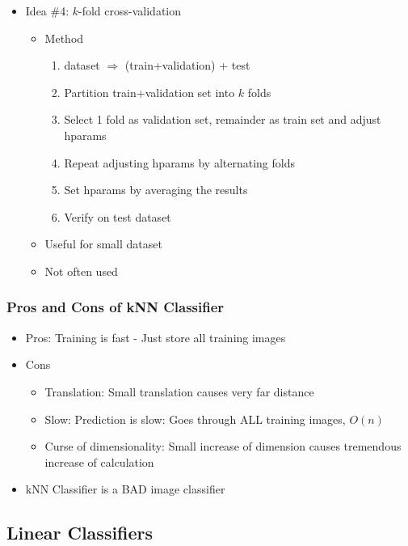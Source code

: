 \begin{itemize}
\begin{itemize}
    \end{itemize}
    \item Idea \#4: $k$-fold cross-validation
    \begin{itemize}
        \item Method
        \begin{enumerate}
            \item dataset $\Rightarrow$ (train+validation) + test
            \item Partition train+validation set into $k$ folds
            \item Select 1 fold as validation set, remainder as train set and adjust hparams
            \item Repeat adjusting hparams by alternating folds
            \item Set hparams by averaging the results
            \item Verify on test dataset
        \end{enumerate}
        \item Useful for small dataset
        \item Not often used
    \end{itemize}
\end{itemize}

\subsubsection*{Pros and Cons of kNN Classifier}
\begin{itemize}
    \item Pros: Training is fast - Just store all training images
    \item Cons
    \begin{itemize}
        \item Translation: Small translation causes very far distance
        \item Slow: Prediction is slow: Goes through ALL training images, $O(n)$
        \item Curse of dimensionality: Small increase of dimension causes tremendous increase of calculation
    \end{itemize}
    \item kNN Classifier is a BAD image classifier
\end{itemize}
\clearpage

\subsection{Linear Classifiers}

